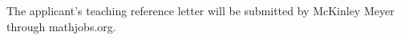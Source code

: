 \documentclass[12pt]{article}
\begin{document}
\noindent The applicant's teaching reference letter will be submitted by
McKinley Meyer through mathjobs.org.
\end{document}
